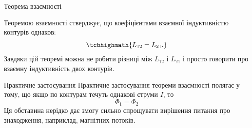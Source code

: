 \documentclass[onlytextwidth]{beamer}
\begin{document}
\begin{frame}{Теорема взаємності}{}
	\begin{block}{}\justifying
		Теоремою взаємності стверджує, що коефіцієнтами взаємної індуктивністю контурів однаков:
		\begin{equation*}
			\tcbhighmath{L_{12} = L_{21}.}
		\end{equation*}
		Завдяки цій теоремі можна не робити різниці між $L_{12}$ і $L_{21}$ і просто говорити про взаємну індуктивність двох контурів.
	\end{block}

	\begin{block}{Практичне застосування}\justifying
		Практичне застосування теореми взаємності полягає у тому, що якщо по контурам течуть однакові струми $I$, то
		\begin{equation*}
			\Phi_1 = \Phi_2
		\end{equation*}
		Ця обставина нерідко дає змогу сильно спрощувати вирішення питання про знаходження, наприклад, магнітних потоків.
	\end{block}
\end{frame}
\end{document}
